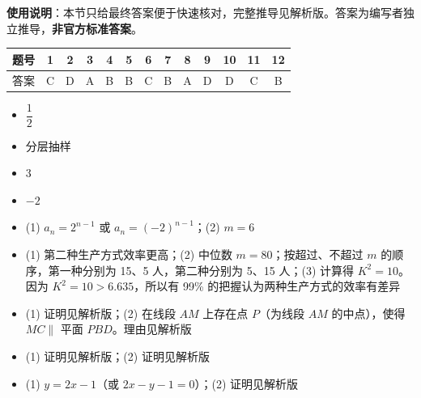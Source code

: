
\begin{gknotice}
\textbf{使用说明}：本节只给最终答案便于快速核对，完整推导见解析版。答案为编写者独立推导，\textbf{非官方标准答案}。
\end{gknotice}

\begin{center}\begin{tabular}{ccccccccccccc}
\toprule
题号 & 1 & 2 & 3 & 4 & 5 & 6 & 7 & 8 & 9 & 10 & 11 & 12 \\
\midrule
答案 & C & D & A & B & B & C & B & A & D & D & C & B \\
\bottomrule
\end{tabular}\end{center}

\begin{itemize}[leftmargin=2.6em]
  \item[\textbf{13.}] $\dfrac12$
  \item[\textbf{14.}] 分层抽样
  \item[\textbf{15.}] $3$
  \item[\textbf{16.}] $-2$
\end{itemize}

\begin{itemize}[leftmargin=2.6em]
  \item[\textbf{17.}] (1) $a_n = 2^{n-1}$ 或 $a_n = (-2)^{n-1}$；(2) $m = 6$
  \item[\textbf{18.}] (1) 第二种生产方式效率更高；(2) 中位数 $m=80$；按超过、不超过 $m$ 的顺序，第一种分别为 15、5 人，第二种分别为 5、15 人；(3) 计算得 $K^2 = 10$。因为 $K^2 = 10 > 6.635$，所以有 99\% 的把握认为两种生产方式的效率有差异
  \item[\textbf{19.}] (1) 证明见解析版；(2) 在线段 $AM$ 上存在点 $P$（为线段 $AM$ 的中点），使得 $MC \parallel$ 平面 $PBD$。理由见解析版
  \item[\textbf{20.}] (1) 证明见解析版；(2) 证明见解析版
  \item[\textbf{21.}] (1) $y = 2x - 1$（或 $2x - y - 1 = 0$）；(2) 证明见解析版
\end{itemize}

